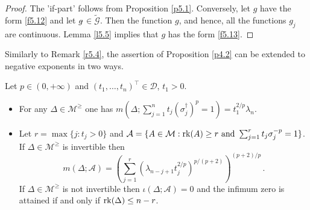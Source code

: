 \documentclass{amsart}
\begin{document}
\begin{proof}
The 'if-part' follows from Proposition \ref{p5.1}. Conversely, let $g$ have the form \eqref{f5.12} and let $g\tilde{\,} \in \tilde{{\mathcal G}}$. Then the function $g$, and hence, all the functions $g_j$ are continuous. Lemma \ref{l5.5} implies that $g$ has the form \eqref{f5.13}. 
\end{proof}   

Similarly to Remark \ref{r5.4}, the assertion of Proposition \ref{p4.2} can be extended to negative exponents in two ways.

\begin{pro}   \label{p5.7}
    Let $p \in (0,+\infty)$ and $(t_1,\ldots,t_n)^\top \in \mathcal D$, $t_1 > 0$.
    \begin{itemize}
    \item[(i)]  For any $\Delta \in {\mathcal M}^\geq$ one has  $m(\Delta ; \sum_{j=1}^n t_j (\sigma_j^{\dagger})^p = 1 ) = t_1^{2/p} \lambda_n$. 
    \item[(ii)] Let $r=\max \{ j : t_j >0 \}$ and ${\mathcal A} = \{ A \in {\mathcal M} : {\rm rk}(A) \geq r \,\, {\rm and} \,\,\sum_{j=1}^r t_j \sigma_j^{-p} = 1 \}$. If $\Delta \in {\mathcal M}^\geq$ is invertible then 
    \begin{equation} \label{f5.14}
         m(\Delta ; {\mathcal A}) = \left(\sum_{j=1}^r \left(\lambda_{n-j+1} t_j^{2/p} \right)^{p / (p+2)} \right)^{(p+2)/p}   \, .
    \end{equation}
    If $\Delta \in {\mathcal M}^\geq$ is not invertible then $\iota(\Delta ; {\mathcal A})=0$ and the infimum zero is attained if and only if ${\rm rk}(\Delta) \leq n-r$.  
    \end{itemize}   
\end{pro}
\end{document}
